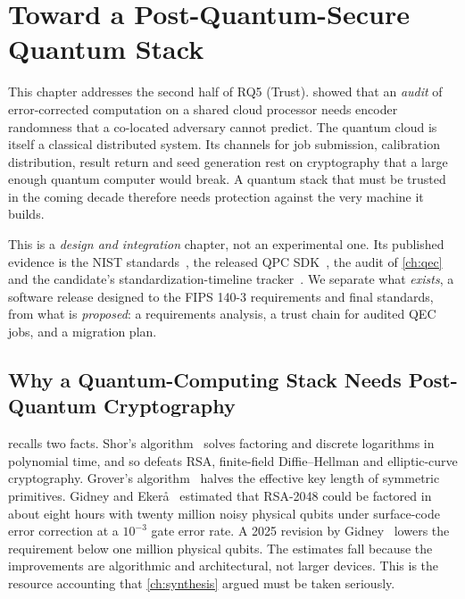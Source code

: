 \chapter{Toward a Post-Quantum-Secure Quantum Stack}\label{ch:pqc}

This chapter addresses the second half of RQ5 (Trust).  showed that an \emph{audit} of error-corrected computation on a shared cloud processor needs encoder randomness that a co-located adversary cannot predict. The quantum cloud is itself a classical distributed system. Its channels for job submission, calibration distribution, result return and seed generation rest on cryptography that a large enough quantum computer would break. A quantum stack that must be trusted in the coming decade therefore needs protection against the very machine it builds.

This is a \emph{design and integration} chapter, not an experimental one. Its published evidence is the NIST standards~\cite{nist2024fips203,nist2024fips204,nist2024fips205,nist2019fips1403,nist2015sp80090a}, the released QPC SDK~\cite{guo2026lightriderqpc}, the audit of \cref{ch:qec}~\cite{guo2026qecaudit} and the candidate's standardization-timeline tracker~\cite{guo2026nisttracker}. We separate what \emph{exists}, a software release designed to the FIPS 140-3 requirements and final standards, from what is \emph{proposed}: a requirements analysis, a trust chain for audited QEC jobs, and a migration plan.

\section{Why a Quantum-Computing Stack Needs Post-Quantum Cryptography}\label{sec:pqc:why}

 recalls two facts. Shor's algorithm~\cite{shor1997factoring} solves factoring and discrete logarithms in polynomial time, and so defeats RSA, finite-field Diffie--Hellman and elliptic-curve cryptography. Grover's algorithm~\cite{grover1996search} halves the effective key length of symmetric primitives. Gidney and Eker{\aa}~\cite{gidney2021rsa} estimated that RSA-2048 could be factored in about eight hours with twenty million noisy physical qubits under surface-code error correction at a $10^{-3}$ gate error rate. A 2025 revision by Gidney~\cite{gidney2025million} lowers the requirement below one million physical qubits. The estimates fall because the improvements are algorithmic and architectural, not larger devices. This is the resource accounting that \cref{ch:synthesis} argued must be taken seriously.

